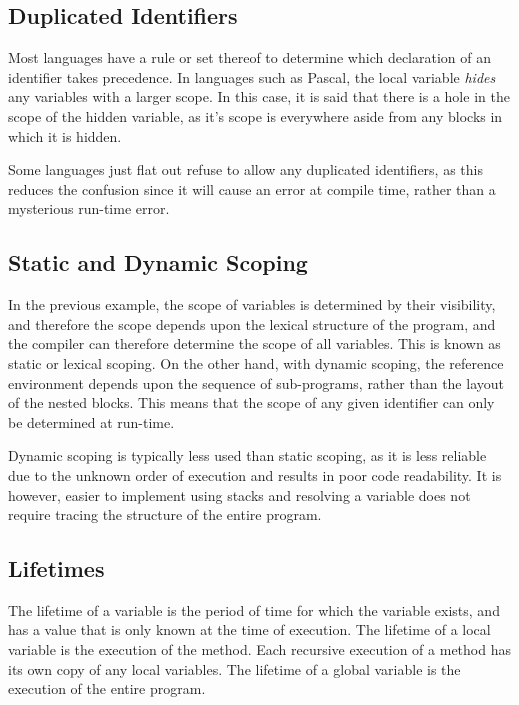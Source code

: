 \subsection*{Duplicated Identifiers}

Most languages have a rule or set thereof to determine which declaration of an identifier takes precedence. In languages
 such as Pascal, the local variable \textit{hides} any variables with a larger scope. In this case, it is said that
 there is a hole in the scope of the hidden variable, as it's scope is everywhere aside from any blocks in which it is
 hidden.

Some languages just flat out refuse to allow any duplicated identifiers, as this reduces the confusion since it will
 cause an error at compile time, rather than a mysterious run-time error.

\subsection*{Static and Dynamic Scoping}

In the previous example, the scope of variables is determined by their visibility, and therefore the scope depends upon
 the lexical structure of the program, and the compiler can therefore determine the scope of all variables. This is
 known as static or lexical scoping. On the other hand, with dynamic scoping, the reference environment depends upon the
 sequence of sub-programs, rather than the layout of the nested blocks. This means that the scope of any given identifier
 can only be determined at run-time.

Dynamic scoping is typically less used than static scoping, as it is less reliable due to the unknown order of execution
 and results in poor code readability. It is however, easier to implement using stacks and resolving a variable does not
 require tracing the structure of the entire program.

\subsection*{Lifetimes}

The lifetime of a variable is the period of time for which the variable exists, and has a value that is only known at
 the time of execution. The lifetime of a local variable is the execution of the method. Each recursive execution of a
 method has its own copy of any local variables. The lifetime of a global variable is the execution of the entire program.

